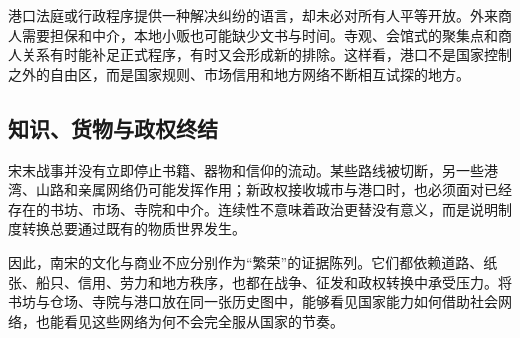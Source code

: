 港口法庭或行政程序提供一种解决纠纷的语言，却未必对所有人平等开放。外来商人需要担保和中介，本地小贩也可能缺少文书与时间。寺观、会馆式的聚集点和商人关系有时能补足正式程序，有时又会形成新的排除。这样看，港口不是国家控制之外的自由区，而是国家规则、市场信用和地方网络不断相互试探的地方。

\subsection{知识、货物与政权终结}

宋末战事并没有立即停止书籍、器物和信仰的流动。某些路线被切断，另一些港湾、山路和亲属网络仍可能发挥作用；新政权接收城市与港口时，也必须面对已经存在的书坊、市场、寺院和中介。连续性不意味着政治更替没有意义，而是说明制度转换总要通过既有的物质世界发生。

因此，南宋的文化与商业不应分别作为“繁荣”的证据陈列。它们都依赖道路、纸张、船只、信用、劳力和地方秩序，也都在战争、征发和政权转换中承受压力。将书坊与仓场、寺院与港口放在同一张历史图中，能够看见国家能力如何借助社会网络，也能看见这些网络为何不会完全服从国家的节奏。
